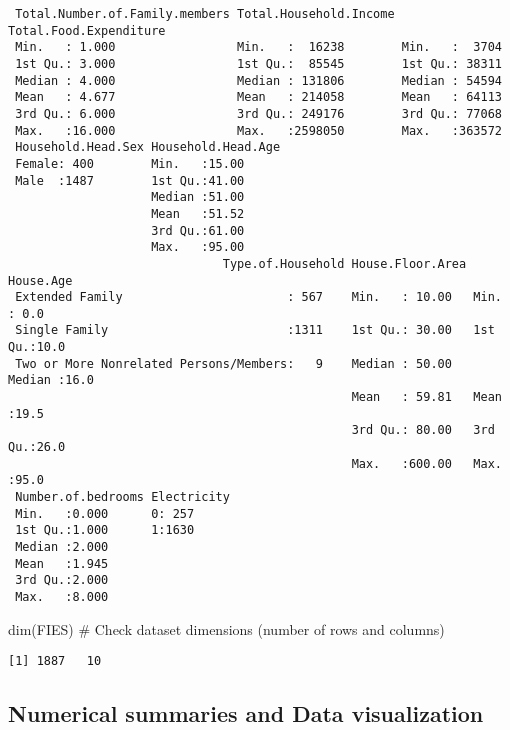 \documentclass[
]{article}
\newenvironment{Shaded}{\begin{snugshade}}{\end{snugshade}}
\newcommand{\CommentTok}[1]{\textcolor[rgb]{0.37,0.37,0.37}{#1}}
\newcommand{\FunctionTok}[1]{\textcolor[rgb]{0.28,0.35,0.67}{#1}}
\newcommand{\NormalTok}[1]{\textcolor[rgb]{0.00,0.23,0.31}{#1}}
\begin{document}
\begin{verbatim}
 Total.Number.of.Family.members Total.Household.Income Total.Food.Expenditure
 Min.   : 1.000                 Min.   :  16238        Min.   :  3704        
 1st Qu.: 3.000                 1st Qu.:  85545        1st Qu.: 38311        
 Median : 4.000                 Median : 131806        Median : 54594        
 Mean   : 4.677                 Mean   : 214058        Mean   : 64113        
 3rd Qu.: 6.000                 3rd Qu.: 249176        3rd Qu.: 77068        
 Max.   :16.000                 Max.   :2598050        Max.   :363572        
 Household.Head.Sex Household.Head.Age
 Female: 400        Min.   :15.00     
 Male  :1487        1st Qu.:41.00     
                    Median :51.00     
                    Mean   :51.52     
                    3rd Qu.:61.00     
                    Max.   :95.00     
                              Type.of.Household House.Floor.Area   House.Age   
 Extended Family                       : 567    Min.   : 10.00   Min.   : 0.0  
 Single Family                         :1311    1st Qu.: 30.00   1st Qu.:10.0  
 Two or More Nonrelated Persons/Members:   9    Median : 50.00   Median :16.0  
                                                Mean   : 59.81   Mean   :19.5  
                                                3rd Qu.: 80.00   3rd Qu.:26.0  
                                                Max.   :600.00   Max.   :95.0  
 Number.of.bedrooms Electricity
 Min.   :0.000      0: 257     
 1st Qu.:1.000      1:1630     
 Median :2.000                 
 Mean   :1.945                 
 3rd Qu.:2.000                 
 Max.   :8.000                 
\end{verbatim}

\begin{Shaded}
\begin{Highlighting}[]
\FunctionTok{dim}\NormalTok{(FIES) }\CommentTok{\# Check dataset dimensions (number of rows and columns)}
\end{Highlighting}
\end{Shaded}

\begin{verbatim}
[1] 1887   10
\end{verbatim}

\hypertarget{numerical-summaries-and-data-visualization}{%
\subsection{Numerical summaries and Data
visualization}\label{numerical-summaries-and-data-visualization}}
\end{document}
